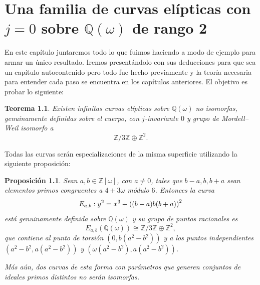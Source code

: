 \documentclass[a4paper]{book}
\theoremstyle{definition}
\theoremstyle{plain}
\newtheorem{theorem}[definition]{Teorema}
\newtheorem{prop}[definition]{Proposición}
\newcommand{\QQ}{\mathbb{Q}}
\newcommand{\ZZ}{\mathbb{Z}}
\newcommand{\lp}{\left\lparen}
\newcommand{\rp}{\right\rparen}
\begin{document}
\chapter{Una familia de curvas elípticas con \texorpdfstring{$j=0$}{j=0} sobre \texorpdfstring{$\QQ(\omega)$}{Q(omega)} de rango 2}\label{cap:result} %

En este capítulo juntaremos todo lo que fuimos haciendo a modo de ejemplo para armar un único resultado. Iremos presentándolo con sus deducciones para que sea un capítulo autocontenido pero todo fue hecho previamente y la teoría necesaria para entender cada paso se encuentra en los capítulos anteriores. El objetivo es probar lo siguiente:

\begin{theorem}\label{thm:elTeo}
Existen infinitas curvas elípticas sobre $\QQ(\omega)$ no isomorfas, genuinamente definidas sobre el cuerpo, con $j$-invariante $0$ y grupo de Mordell--Weil isomorfo a
\[
\ZZ/3\ZZ\oplus\ZZ^2.
\]
\end{theorem}

Todas las curvas serán especializaciones de la misma superficie utilizando la siguiente proposición:

\begin{prop}\label{prop:laProp}
Sean $a,b\in\ZZ[\omega]$, con $a\neq0$, tales que $b-a,b,b+a$ sean elementos primos congruentes a $4+3\omega$ módulo $6$. Entonces la curva
\[
E_{a,b}:y^2=x^3+\lp (b-a)b(b+a)\rp^2
\]
está genuinamente definida sobre $\QQ(\omega)$ y su grupo de puntos racionales es
\[
E_{a,b}(\QQ(\omega))\cong\ZZ/3\ZZ\oplus\ZZ^2,
\]
que contiene al punto de torsión $(0,b(a^2-b^2))$ y a los puntos independientes $(a^2-b^2,a(a^2-b^2))$ y $(\omega (a^2-b^2),a(a^2-b^2))$. 

Más aún, dos curvas de esta forma con parámetros que generen conjuntos de ideales primos distintos no serán isomorfas.
\end{prop}
\end{document}
